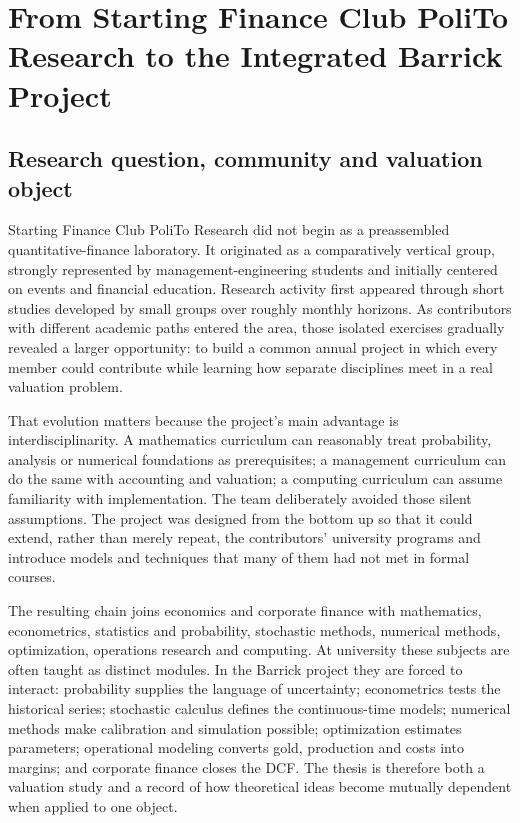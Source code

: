 \chapter{From Starting Finance Club PoliTo Research to the Integrated Barrick Project}
\label{ch:introduction}

\section{Research question, community and valuation object}

Starting Finance Club PoliTo Research did not begin as a preassembled
quantitative-finance laboratory.
It originated as a comparatively vertical group, strongly represented by
management-engineering students and initially centered on events and financial
education. Research activity first appeared through short studies developed by
small groups over roughly monthly horizons. As contributors with different
academic paths entered the area, those isolated exercises gradually revealed a
larger opportunity: to build a common annual project in which every member
could contribute while learning how separate disciplines meet in a real
valuation problem.

That evolution matters because the project's main advantage is
interdisciplinarity. A mathematics curriculum can reasonably treat probability,
analysis or numerical foundations as prerequisites; a management curriculum
can do the same with accounting and valuation; a computing curriculum can
assume familiarity with implementation. The team deliberately avoided those
silent assumptions. The project was designed from the bottom up so that it
could extend, rather than merely repeat, the contributors' university
programs and introduce models and techniques that many of them had not met
in formal courses.

The resulting chain joins economics and corporate finance with mathematics,
econometrics, statistics and probability, stochastic methods, numerical
methods, optimization, operations research and computing. At university these
subjects are often taught as distinct modules. In the Barrick project they are
forced to interact: probability supplies the language of uncertainty;
econometrics tests the historical series; stochastic calculus defines the
continuous-time models; numerical methods make calibration and simulation
possible; optimization estimates parameters; operational modeling converts
gold, production and costs into margins; and corporate finance closes the DCF.
The thesis is therefore both a valuation study and a record of how theoretical
ideas become mutually dependent when applied to one object.

